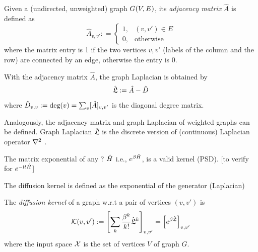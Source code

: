\begin{definition}\label{def:adjacency_matrix}
	Given a (undirected, unweighted) graph $G(V,E)$, its \emph{adjacency matrix} $\hat{A}$ is defined as
	\begin{equation}
		\hat{A}_{v,v'} : = 
		\begin{cases}
			1, & (v,v') \in E \\
			0, & \text{otherwise}
		\end{cases}
	\end{equation}
	where the matrix entry is 1 if the two vertices $v,v'$ (labels of the column and the row) are connected by an edge, otherwise the entry is 0.
\end{definition}
\begin{definition}\label{def:graph_laplacian}
	With the adjacency matrix $\hat{A}$, the graph Laplacian is obtained by
	\begin{equation}
		\hat{\mathfrak{L}}:=\hat{A}-\hat{D}	
	\end{equation}
	where $\hat{D}_{v,v}:=\textup{deg}(v)=\sum_{v}[\hat{A}]_{v,v'}$ is the diagonal degree matrix.
\end{definition}
	Analogously, the adjacency matrix and graph Laplacian of weighted graphs can be defined.
	Graph Laplacian $\hat{\mathfrak{L}}$ is the 
	discrete version of (continuous) Laplacian operator $\laplacian$
	\cite{chungSpectralGraphTheory1997}.
\begin{observation}
	The matrix exponential of any ? $\hat{H}$ i.e., $e^{\beta \hat{H}}$, is a valid kernel (PSD). [to verify for $e^{-\textup{i} t\hat{H}}$]
\end{observation}
The diffusion kernel is defined as the exponential of the generator (Laplacian)
\begin{definition}\label{def:diffusion_kernel}
	The \emph{diffusion kernel} of a graph w.r.t a pair of vertices $(v,v')$ is
	\begin{equation}
		\mathcal{K}(v,v') := 
		\qty[\sum_{k}\frac{\beta^k}{k!}\hat{\mathfrak{L}}^k]_{v,v'}  =
		\qty[e^{\beta \hat{\mathfrak{L}}}]_{v,v'} 
	\end{equation}
	where the input space $\mathcal{X}$ is the set of vertices $V$ of graph $G$.
\end{definition}

